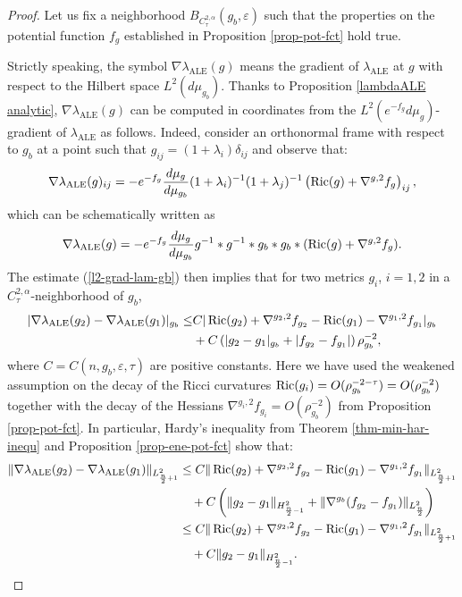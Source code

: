 \documentclass[a4paper,11pt,reqno]{amsart}
\def\Ric{\mathop{\rm Ric}\nolimits}
\def\Ric{\mathop{\rm Ric}\nolimits}
\numberwithin{equation}{section}
\begin{document}
	
	\begin{proof}
		Let us fix a neighborhood $B_{C^{2,\alpha}_{\tau}}(g_b,\varepsilon)$ such that the properties on the potential function $f_g$ established in Proposition \ref{prop-pot-fct} hold true.
		
		Strictly speaking, the symbol $\nabla \lambda_{\operatorname{ALE}}(g)$ means the gradient of $\lambda_{\operatorname{ALE}}$ at $g$ with respect to the Hilbert space $L^2(d\mu_{g_b})$. Thanks to Proposition \ref{lambdaALE analytic}, $\nabla\lambda_{\operatorname{ALE}}(g)$ can be computed in coordinates from the $L^2(e^{-f_g}d\mu_g)$-gradient of $\lambda_{\operatorname{ALE}}$ as follows. Indeed, consider an orthonormal frame with respect to $g_b$ at a point such that $g_{ij}=(1+\lambda_i)\delta_{ij}$ and observe that:
		\begin{equation*}
\nabla\lambda_{\operatorname{ALE}}(g)_{ij}=-e^{-f_g}\frac{d\mu_g}{d\mu_{g_b}}(1+\lambda_i)^{-1}(1+\lambda_j)^{-1}\left(\Ric(g)+\nabla^{g,2}f_g\right)_{ij},
\end{equation*}
which can be schematically written as 
\begin{equation}
\nabla\lambda_{\operatorname{ALE}}(g)=-e^{-f_g}\frac{d\mu_g}{d\mu_{g_b}}g^{-1}\ast g^{-1}\ast g_b\ast g_b\ast (\Ric(g)+\nabla^{g,2}f_g).\label{l2-grad-lam-gb}
\end{equation}
The estimate (\ref{l2-grad-lam-gb}) then implies that for two metrics $g_i$, $i=1,2$ in a $C^{2,\alpha}_{\tau}$-neighborhood of $g_b$,
\begin{equation}
\begin{split}
|\nabla\lambda_{\operatorname{ALE}}(g_2)-\nabla\lambda_{\operatorname{ALE}}(g_1)|_{g_b}\leq& C |\Ric(g_2)+\nabla^{g_2,2}f_{g_2}-\Ric(g_1)-\nabla^{g_1,2}f_{g_1}|_{g_b}\\
&+C\left(|g_2-g_1|_{g_b}+|f_{g_2}-f_{g_1}|\right)\rho_{g_b}^{-2},
\label{red-case-l2-wei-grad}
\end{split}
\end{equation}
where $C=C(n,g_b,\varepsilon,\tau)$ are positive constants. Here we have used the weakened assumption on the decay of the Ricci curvatures $\Ric(g_i)=O(\rho_{g_b}^{-2-\tau})=O(\rho_{g_b}^{-2})$ together with the decay of the Hessians $\nabla^{g_i,2}f_{g_i}=O(\rho_{g_b}^{-2})$ from Proposition \ref{prop-pot-fct}. In particular, Hardy's inequality from Theorem \ref{thm-min-har-inequ} and Proposition \ref{prop-ene-pot-fct} show that:
\begin{equation}
\begin{split}
\|\nabla\lambda_{\operatorname{ALE}}(g_2)-\nabla\lambda_{\operatorname{ALE}}(g_1)\|_{L^2_{\frac{n}{2}+1}}&\leq C \|\Ric(g_2)+\nabla^{g_2,2}f_{g_2}-\Ric(g_1)-\nabla^{g_1,2}f_{g_1}\|_{L^2_{\frac{n}{2}+1}}\\
&\quad+C\left(\|g_2-g_1\|_{H^2_{\frac{n}{2}-1}}+\|\nabla^{g_b}(f_{g_2}-f_{g_1})\|_{L^2_{\frac{n}{2}}}\right)\\
&\leq C \|\Ric(g_2)+\nabla^{g_2,2}f_{g_2}-\Ric(g_1)-\nabla^{g_1,2}f_{g_1}\|_{L^2_{\frac{n}{2}+1}}\\
&\quad+C\|g_2-g_1\|_{H^2_{\frac{n}{2}-1}}.\label{prel-est-ener-lam}
\end{split}
\end{equation}



\end{proof}
\end{document}
